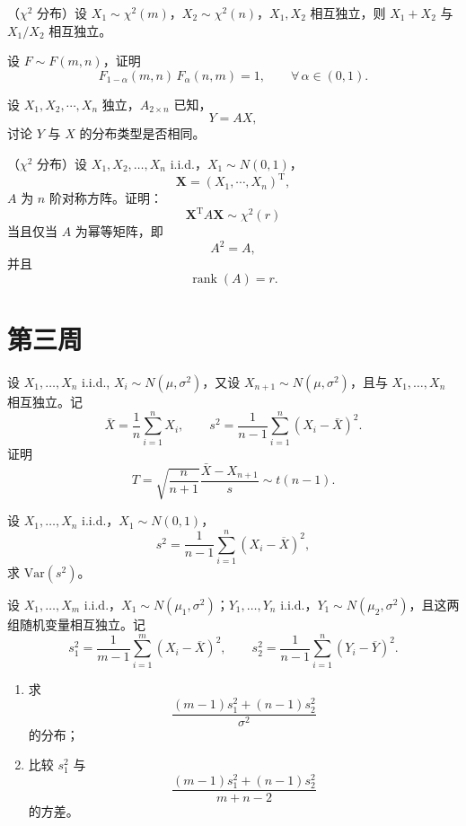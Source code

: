 \begin{homework}[3]
（$\chi^2$ 分布）设 $X_1\sim \chi^2(m)$，$X_2\sim \chi^2(n)$，$X_1,X_2$ 相互独立，则 $X_1+X_2$ 与 $X_1/X_2$ 相互独立。
\end{homework}
\begin{homework}[5]
设 \(F\sim F(m,n)\)，证明
\[
F_{1-\alpha}(m,n)\,F_{\alpha}(n,m)=1,
\qquad \forall\,\alpha\in(0,1).
\]
\end{homework}
\begin{homework}
设 \(X_1,X_2,\cdots,X_n\) 独立，\(A_{2\times n}\) 已知，
\[
Y=AX,
\]
讨论 \(Y\) 与 \(X\) 的分布类型是否相同。
\end{homework}
\begin{homework}
（\(\chi^2\) 分布）设 \(X_1,X_2,\ldots,X_n\) i.i.d.，\(X_1\sim N(0,1)\)，
\[
\mathbf{X}=(X_1,\cdots,X_n)^{\mathrm T},
\]
\(A\) 为 \(n\) 阶对称方阵。证明：
\[
\mathbf{X}^{\mathrm T}A\mathbf{X}\sim \chi^2(r)
\]
当且仅当 \(A\) 为幂等矩阵，即
\[
A^2=A,
\]
并且
\[
\operatorname{rank}(A)=r.
\]
\end{homework}
\section{第三周}
\begin{homework}
设 \(X_1,\dots,X_n\) i.i.d., \(X_i\sim N(\mu,\sigma^2)\)，又设 \(X_{n+1}\sim N(\mu,\sigma^2)\)，且与 \(X_1,\dots,X_n\) 相互独立。记
\[
\bar X=\frac1n\sum_{i=1}^n X_i,\qquad
s^2=\frac1{n-1}\sum_{i=1}^n (X_i-\bar X)^2.
\]
证明
\[
T=\sqrt{\frac{n}{n+1}}\frac{\bar X-X_{n+1}}{s}\sim t(n-1).
\]
\end{homework}
\begin{homework}[2.4第1题]
设 \(X_1,\ldots,X_n\) i.i.d.，\(X_1\sim N(0,1)\)，
\[
s^2=\frac{1}{n-1}\sum_{i=1}^n (X_i-\overline{X})^2,
\]
求 \(\mathrm{Var}(s^2)\)。
\end{homework}

\begin{homework}[2.4第2题]
设 \(X_1,\ldots,X_m\) i.i.d.，\(X_1\sim N(\mu_1,\sigma^2)\)；\(Y_1,\ldots,Y_n\) i.i.d.，\(Y_1\sim N(\mu_2,\sigma^2)\)，且这两组随机变量相互独立。记
\[
s_1^2=\frac{1}{m-1}\sum_{i=1}^m (X_i-\overline{X})^2,\qquad
s_2^2=\frac{1}{n-1}\sum_{i=1}^n (Y_i-\overline{Y})^2.
\]
\begin{enumerate}
    \item 求
    \[
    \frac{(m-1)s_1^2+(n-1)s_2^2}{\sigma^2}
    \]
    的分布；
    \item 比较 \(s_1^2\) 与
    \[
    \frac{(m-1)s_1^2+(n-1)s_2^2}{m+n-2}
    \]
    的方差。
\end{enumerate}
\end{homework}

